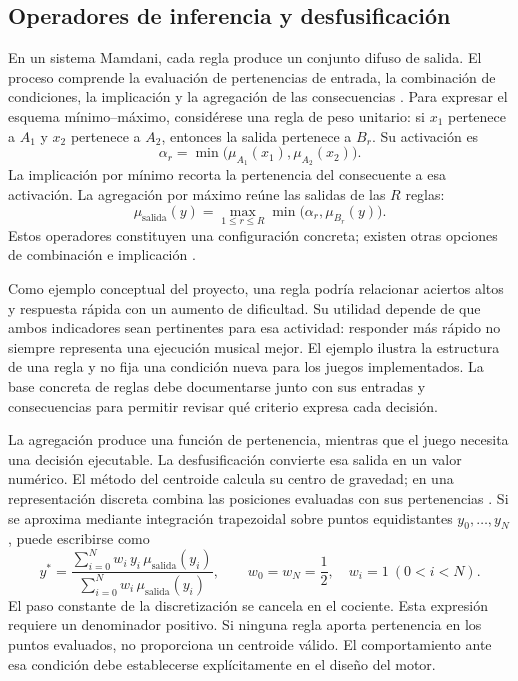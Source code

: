 \subsection{Operadores de inferencia y desfusificación}
\label{sec:inferencia-mamdani}
En un sistema Mamdani, cada regla produce un conjunto difuso de salida. El proceso
comprende la evaluación de pertenencias de entrada, la combinación de condiciones,
la implicación y la agregación de las consecuencias
\parencite{mathworksProcesoDifuso}. Para expresar el esquema mínimo--máximo,
considérese una regla de peso unitario: si \(x_1\) pertenece a \(A_1\) y \(x_2\)
pertenece a \(A_2\), entonces la salida pertenece a \(B_r\). Su activación es
\begin{equation}
  \alpha_r=\min\bigl(\mu_{A_1}(x_1),\mu_{A_2}(x_2)\bigr).
  \label{eq:activacion-mamdani}
\end{equation}
La implicación por mínimo recorta la pertenencia del consecuente a esa activación.
La agregación por máximo reúne las salidas de las \(R\) reglas:
\begin{equation}
  \mu_{\mathrm{salida}}(y)=
  \max_{1\leq r\leq R}\min\bigl(\alpha_r,\mu_{B_r}(y)\bigr).
  \label{eq:agregacion-mamdani}
\end{equation}
Estos operadores constituyen una configuración concreta; existen otras opciones
de combinación e implicación \parencite{mathworksProcesoDifuso}.

Como ejemplo conceptual del proyecto, una regla podría relacionar aciertos altos
y respuesta rápida con un aumento de dificultad. Su utilidad depende de que ambos
indicadores sean pertinentes para esa actividad: responder más rápido no siempre
representa una ejecución musical mejor. El ejemplo ilustra la estructura de una
regla y no fija una condición nueva para los juegos implementados. La base concreta
de reglas debe documentarse junto con sus entradas y consecuencias para permitir
revisar qué criterio expresa cada decisión.


\label{sec:centroide-ajuste}
La agregación produce una función de pertenencia, mientras que el juego necesita
una decisión ejecutable. La desfusificación convierte esa salida en un valor
numérico. El método del centroide calcula su centro de gravedad; en una
representación discreta combina las posiciones evaluadas con sus pertenencias
\parencite{mathworksDesfusificacion}. Si se aproxima mediante integración
trapezoidal sobre puntos equidistantes \(y_0,\ldots,y_N\), puede escribirse como
\begin{equation}
  y^* =
  \frac{\sum_{i=0}^{N}w_i\,y_i\,\mu_{\mathrm{salida}}(y_i)}
       {\sum_{i=0}^{N}w_i\,\mu_{\mathrm{salida}}(y_i)},
  \qquad
  w_0=w_N=\frac{1}{2},\quad w_i=1\ (0<i<N).
  \label{eq:centroide-discreto}
\end{equation}
El paso constante de la discretización se cancela en el cociente. Esta expresión
requiere un denominador positivo. Si ninguna regla aporta pertenencia en los puntos
evaluados, no proporciona un centroide válido. El comportamiento ante esa condición
debe establecerse explícitamente en el diseño del motor.

